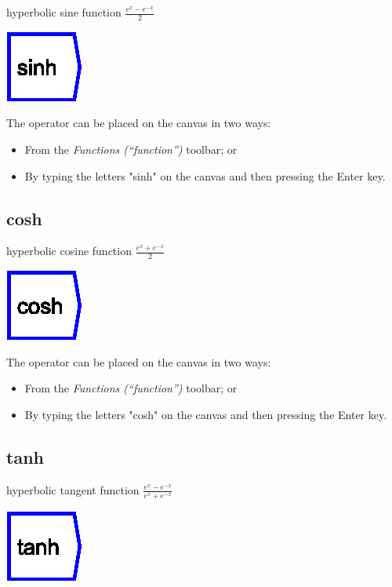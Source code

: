 \label{Operation:sinh} hyperbolic sine function $\frac{e^{x}-e^{-x}}{2}$ 

\includegraphics{images/sinh}

The operator can be placed on the canvas in two ways:
\begin{itemize}
\item From the \emph{Functions (``function'')} toolbar; or 
\item By typing the letters "sinh" on the canvas and then pressing the
Enter key.
\end{itemize}

\subsection{cosh}

\label{Operation:cosh} hyperbolic cosine function $\frac{e^{x}+e^{-x}}{2}$ 

\includegraphics{images/cosh}

The operator can be placed on the canvas in two ways:
\begin{itemize}
\item From the \emph{Functions (``function'')} toolbar; or 
\item By typing the letters "cosh" on the canvas and then pressing the
Enter key.
\end{itemize}

\subsection{tanh}

\label{Operation:tanh} hyperbolic tangent function $\frac{e^{x}-e^{-x}}{e^{x}+e^{-x}}$ 

\includegraphics{images/tanh}

